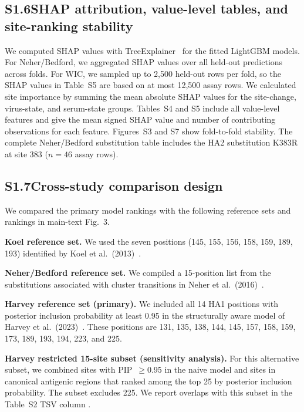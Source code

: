\documentclass[12pt]{article}
\begin{document}
\subsection*{S1.6\quad SHAP attribution, value-level tables, and site-ranking stability}

We computed SHAP values with TreeExplainer~\cite{Lundberg2020NatMachIntell} for the fitted LightGBM models. For Neher/Bedford, we aggregated SHAP values over all held-out predictions across folds. For WIC, we sampled up to 2,500 held-out rows per fold, so the SHAP values in Table~S5 are based on at most 12,500 assay rows. We calculated site importance by summing the mean absolute SHAP values for the site-change, virus-state, and serum-state groups. Tables~S4 and S5 include all value-level features and give the mean signed SHAP value and number of contributing observations for each feature. Figures~S3 and S7 show fold-to-fold stability. The complete Neher/Bedford substitution table includes the HA2 substitution K383R at site 383 ($n=46$ assay rows).

\subsection*{S1.7\quad Cross-study comparison design}

We compared the primary model rankings with the following reference sets and rankings in main-text Fig.~3.

\textbf{Koel reference set.} We used the seven positions (145, 155, 156, 158, 159, 189, 193) identified by Koel et al.\ (2013)~\cite{Koel2013Science}.

\textbf{Neher/Bedford reference set.} We compiled a 15-position list from the substitutions associated with cluster transitions in Neher et al.\ (2016)~\cite{Neher2016PNAS}.

\textbf{Harvey reference set (primary).} We included all 14 HA1 positions with posterior inclusion probability at least 0.95 in the structurally aware model of Harvey et al.\ (2023)~\cite{Harvey2023PLoSComputBiol}. These positions are 131, 135, 138, 144, 145, 157, 158, 159, 173, 189, 193, 194, 223, and 225.

\textbf{Harvey restricted 15-site subset (sensitivity analysis).} For this alternative subset, we combined sites with PIP~$\geq$0.95 in the naive model and sites in canonical antigenic regions that ranked among the top 25 by posterior inclusion probability. The subset excludes 225. We report overlaps with this subset in the Table~S2 TSV column .
\end{document}
